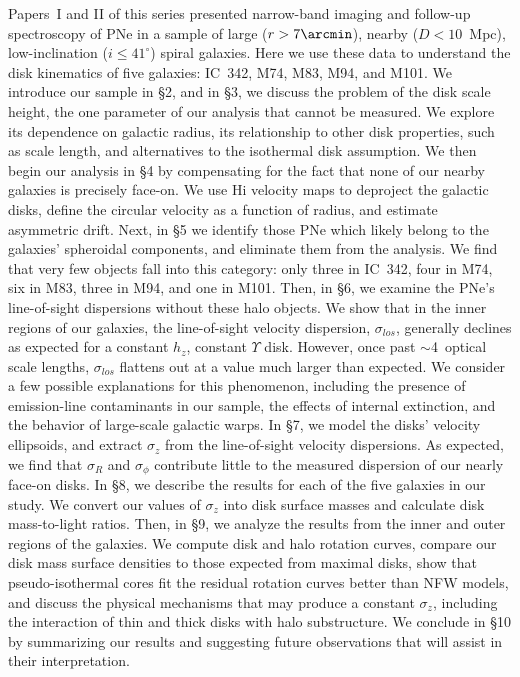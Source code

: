 \documentclass[12pt,preprint]{emulateapj}
\begin{document}
Papers~I and II of this series \citep{thesis1, thesis2} presented narrow-band imaging and follow-up spectroscopy of PNe in a sample of large ($r > 7\arcmin$), nearby ($D < 10$~Mpc), low-inclination ($i \leq 41^\circ$) spiral galaxies.  Here we use these data to understand the disk kinematics of five galaxies:  IC~342, M74, M83, M94, and M101.  We introduce our sample in \S2, and in \S3, we discuss the problem of the disk scale height, the one parameter of our analysis that cannot be measured.   We explore its dependence on galactic radius, its relationship to other disk properties, such as scale length, and alternatives to the isothermal disk assumption.  We then begin our analysis in \S4 by compensating for the fact that none of our nearby galaxies is precisely face-on.  We use H{\sc i} velocity maps to deproject the galactic disks, define the circular velocity as a function of radius, and estimate asymmetric drift.  Next, in \S5 we identify those PNe which likely belong to the galaxies' spheroidal components, and eliminate them from the analysis.  We find that very few objects fall into this category: only three in IC~342, four in M74, six in M83, three in M94, and one in M101.  Then, in \S6, we examine the PNe's line-of-sight dispersions without these halo objects.   We show that in the inner regions of our galaxies, the line-of-sight velocity dispersion, $\sigma_{los}$, generally declines as expected for a constant $h_z$, constant $\Upsilon$ disk.  However, once past $\sim$4~optical scale lengths, $\sigma_{los}$ flattens out at a value much larger than expected.   We consider a few possible explanations for this phenomenon, including the presence of emission-line contaminants in our sample, the effects of internal extinction, and the behavior of large-scale galactic warps.  In \S7, we model the disks' velocity ellipsoids, and extract $\sigma_z$ from the line-of-sight velocity dispersions.  As expected, we find that $\sigma_R$ and $\sigma_{\phi}$ contribute little to the measured dispersion of our nearly face-on disks.  In \S8, we describe the results for each of the five galaxies in our study.  We convert our values of $\sigma_z$ into disk surface masses and calculate disk mass-to-light ratios.  Then, in \S9, we analyze the results from the inner and outer regions of the galaxies.  We compute disk and halo rotation curves, compare our disk mass surface densities to those expected from maximal disks, show that pseudo-isothermal cores fit the residual rotation curves better than NFW models, and discuss the physical mechanisms that may produce a constant $\sigma_z$, including the interaction of thin and thick disks with halo substructure.   We conclude in \S10 by summarizing our results and suggesting future observations that will assist in their interpretation.
\end{document}
